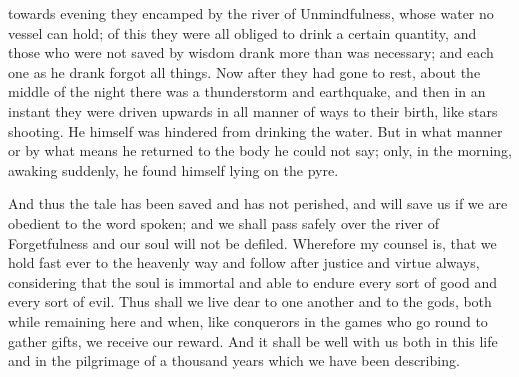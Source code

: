 \documentclass[12pt]{article}
\begin{document}
towards evening they encamped by the river of Unmindfulness, whose water no
vessel can hold; of this they were all obliged to drink a certain quantity, and
those who were not saved by wisdom drank more than was necessary; and each one
as he drank forgot all things. Now after they had gone to rest, about the
middle of the night there was a thunderstorm and earthquake, and then in an
instant they were driven upwards in all manner of ways to their birth, like
stars shooting. He himself was hindered from drinking the water.  But in what
manner or by what means he returned to the body he could not say; only, in the
morning, awaking suddenly, he found himself lying on the pyre.

And thus the tale has been saved and has not perished, and will save us if we
are obedient to the word spoken; and we shall pass safely over the river of
Forgetfulness and our soul will not be defiled. Wherefore my counsel is, that
we hold fast ever to the heavenly way and follow after justice and virtue
always, considering that the soul is immortal and able to endure every sort of
good and every sort of evil. Thus shall we live dear to one another and to the
gods, both while remaining here and when, like conquerors in the games who go
round to gather gifts, we receive our reward. And it shall be well with us both
in this life and in the pilgrimage of a thousand years which we have been
describing.
\end{document}
